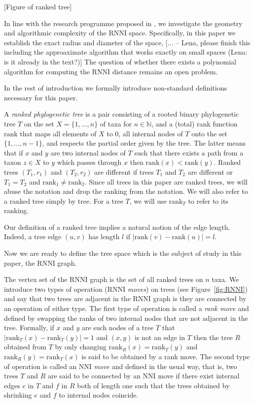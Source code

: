 \documentclass{amsart}
\newcommand{\rank}{\mathrm{rank}}
\newcommand{\nni}{\mathrm{NNI}}
\newcommand{\rnni}{\mathrm{RNNI}}
\begin{document}
[Figure of ranked tree]

In line with the research programme proposed in \autocite{Gavryushkin2018-ol}, we investigate the geometry and algorithmic complexity of the $\rnni$ space.
Specifically, in this paper we establish the exact radius and diameter of the space, [... -- Lena, please finish this including the approaximate algorithm that works exactly on small spaces (Lena: is it already in the text?)]
The question of whether there exists a polynomial algorithm for computing the $\rnni$ distance remains an open problem.

In the rest of introduction we formally introduce non-standard definitions necessary for this paper.

A \emph{ranked phylogenetic tree} is a pair consisting of a rooted binary phylogenetic tree $T$ on the set $X = \{1, \ldots, n\}$ of taxa for $n \in \mathbb N$, and a (total) rank function $\rank$ that maps all elements of $X$ to $0$, all internal nodes of $T$ onto the set $\{1, \ldots, n-1\}$, and respects the partial order given by the tree.
The latter means that if $x$ and $y$ are two internal nodes of $T$ such that there exists a path from a taxon $z \in X$ to $y$ which passes through $x$ then $\rank(x) < \rank(y)$.
Ranked trees $(T_1, r_1)$ and $(T_2, r_2)$ are different if trees $T_1$ and $T_2$ are different or $T_1 = T_2$ and $\rank_1 \neq \rank_2$.
Since all trees in this paper are ranked trees, we will abuse the notation and drop the ranking from the notation.
We will also refer to a ranked tree simply by tree.
For a tree $T$, we will use $\rank_T$ to refer to its ranking.

Our definition of a ranked tree implies a natural notion of the edge length.
Indeed, a tree edge $(u,v)$ has length $l$ if $|\rank(v) - \rank(u)| = l$.

Now we are ready to define the tree space which is the subject of study in this paper, the $\rnni$ graph.

The vertex set of the $\rnni$ graph is the set of all ranked trees on $n$ taxa.
We introduce two types of operation ($\rnni$ \emph{moves}) on trees (see Figure~\ref{fig:RNNI}) and say that two trees are adjacent in the $\rnni$ graph is they are connected by an operation of either type.
The first type of operation is called a \emph{rank move} and defined by swapping the ranks of two internal nodes that are not adjacent in the tree.
Formally, if $x$ and $y$ are such nodes of a tree $T$ that $|\rank_T(x) - \rank_T(y)| = 1$ and $(x, y)$ is not an edge in $T$ then the tree $R$ obtained from $T$ by only changing $\rank_R(x) = \rank_T(y)$ and $\rank_R(y) = \rank_T(x)$ is said to be obtained by a rank move.
The second type of operation is called an $\nni$ \emph{move} and defined in the usual way, that is, two trees $T$ and $R$ are said to be connected by an $\nni$ move if there exist internal edges $e$ in $T$ and $f$ in $R$ both of length one such that the trees obtained by shrinking $e$ and $f$ to internal nodes coincide.
\end{document}

